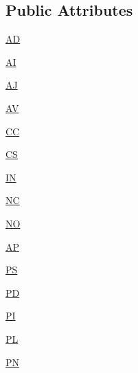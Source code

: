 \subsection*{Public Attributes}
\begin{DoxyCompactItemize}
\item 
\hyperlink{enumbr_1_1usp_1_1cata_1_1util_1_1lemmatizer_1_1_lemmatizer_tags_ae7ea3441682e34e3bc0b1d1a03e4b0f9}{A\+D}
\item 
\hyperlink{enumbr_1_1usp_1_1cata_1_1util_1_1lemmatizer_1_1_lemmatizer_tags_a744bcaaf15eb088091473e13b5c2128a}{A\+I}
\item 
\hyperlink{enumbr_1_1usp_1_1cata_1_1util_1_1lemmatizer_1_1_lemmatizer_tags_a97ef4f2252613d5fc4cc32c8a894d3c0}{A\+J}
\item 
\hyperlink{enumbr_1_1usp_1_1cata_1_1util_1_1lemmatizer_1_1_lemmatizer_tags_a8e16e299d36495c43a2382404adc445a}{A\+V}
\item 
\hyperlink{enumbr_1_1usp_1_1cata_1_1util_1_1lemmatizer_1_1_lemmatizer_tags_a2214907d6379a57779b7cb2990f1c2ca}{C\+C}
\item 
\hyperlink{enumbr_1_1usp_1_1cata_1_1util_1_1lemmatizer_1_1_lemmatizer_tags_a4a0f868743ff1e2647bade186afda345}{C\+S}
\item 
\hyperlink{enumbr_1_1usp_1_1cata_1_1util_1_1lemmatizer_1_1_lemmatizer_tags_adf6dd796ec77087136b67042ce4eb9a0}{I\+N}
\item 
\hyperlink{enumbr_1_1usp_1_1cata_1_1util_1_1lemmatizer_1_1_lemmatizer_tags_ad8372cdebdd6d0c3cb8ebc66652e946e}{N\+C}
\item 
\hyperlink{enumbr_1_1usp_1_1cata_1_1util_1_1lemmatizer_1_1_lemmatizer_tags_a1c04325f293317942d55dec65cd5aa9c}{N\+O}
\item 
\hyperlink{enumbr_1_1usp_1_1cata_1_1util_1_1lemmatizer_1_1_lemmatizer_tags_a1fe46a3d03e9c544bd00c4bf94c9995d}{A\+P}
\item 
\hyperlink{enumbr_1_1usp_1_1cata_1_1util_1_1lemmatizer_1_1_lemmatizer_tags_a55f6cb90a2a35f44e1fcba81b39a78ce}{P\+S}
\item 
\hyperlink{enumbr_1_1usp_1_1cata_1_1util_1_1lemmatizer_1_1_lemmatizer_tags_a64d349a7739e170c76665fe6077cdbd6}{P\+D}
\item 
\hyperlink{enumbr_1_1usp_1_1cata_1_1util_1_1lemmatizer_1_1_lemmatizer_tags_ae23d006afd239f56e854f793c49151d7}{P\+I}
\item 
\hyperlink{enumbr_1_1usp_1_1cata_1_1util_1_1lemmatizer_1_1_lemmatizer_tags_ac393dd2c86008485cf2c202862f7a2d9}{P\+L}
\item 
\hyperlink{enumbr_1_1usp_1_1cata_1_1util_1_1lemmatizer_1_1_lemmatizer_tags_aea936ac20f090d259c67172e1912ff5a}{P\+N}

\end{DoxyCompactItemize}
